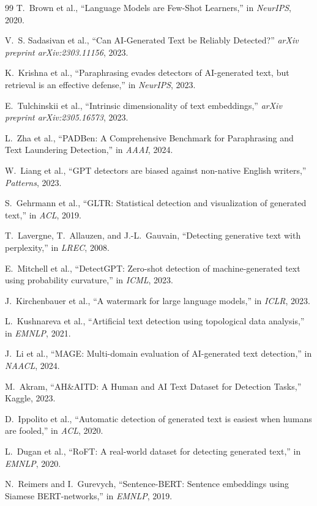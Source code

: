\documentclass[conference]{IEEEtran}
\begin{document}
\begin{thebibliography}{99}
T.~Brown et al., ``Language Models are Few-Shot Learners,'' in \emph{NeurIPS}, 2020.

V.~S. Sadasivan et al., ``Can AI-Generated Text be Reliably Detected?'' \emph{arXiv preprint arXiv:2303.11156}, 2023.

K.~Krishna et al., ``Paraphrasing evades detectors of AI-generated text, but retrieval is an effective defense,'' in \emph{NeurIPS}, 2023.

E.~Tulchinskii et al., ``Intrinsic dimensionality of text embeddings,'' \emph{arXiv preprint arXiv:2305.16573}, 2023.

L.~Zha et al., ``PADBen: A Comprehensive Benchmark for Paraphrasing and Text Laundering Detection,'' in \emph{AAAI}, 2024.

W.~Liang et al., ``GPT detectors are biased against non-native English writers,'' \emph{Patterns}, 2023.

S.~Gehrmann et al., ``GLTR: Statistical detection and visualization of generated text,'' in \emph{ACL}, 2019.

T.~Lavergne, T.~Allauzen, and J.-L.~Gauvain, ``Detecting generative text with perplexity,'' in \emph{LREC}, 2008.

E.~Mitchell et al., ``DetectGPT: Zero-shot detection of machine-generated text using probability curvature,'' in \emph{ICML}, 2023.

J.~Kirchenbauer et al., ``A watermark for large language models,'' in \emph{ICLR}, 2023.

L.~Kushnareva et al., ``Artificial text detection using topological data analysis,'' in \emph{EMNLP}, 2021.

J.~Li et al., ``MAGE: Multi-domain evaluation of AI-generated text detection,'' in \emph{NAACL}, 2024.

M.~Akram, ``AH\&AITD: A Human and AI Text Dataset for Detection Tasks,'' Kaggle, 2023.

D.~Ippolito et al., ``Automatic detection of generated text is easiest when humans are fooled,'' in \emph{ACL}, 2020.

L.~Dugan et al., ``RoFT: A real-world dataset for detecting generated text,'' in \emph{EMNLP}, 2020.

N.~Reimers and I.~Gurevych, ``Sentence-BERT: Sentence embeddings using Siamese BERT-networks,'' in \emph{EMNLP}, 2019.
\end{thebibliography}
\end{document}
